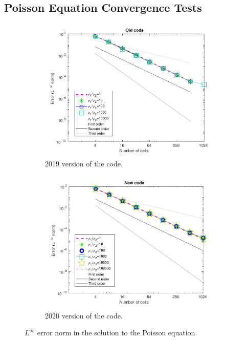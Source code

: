 \documentclass[11pt, a4paper, oneside, openany]{book}
\begin{document}
\subsection{Poisson Equation Convergence Tests}\label{Subsection_Poisson_Equation_Convergence_Tests}
\begin{figure}[!ht]
	\centering
	\begin{subfigure}{.5\textwidth}
		\includegraphics[width=1\textwidth]{PoissonConvergence2019Code.pdf}
		\caption[Poisson Convergence 2019 code]{2019 version of the code.}\label{PoissonTest2019}
	\end{subfigure}%
	\begin{subfigure}{.5\textwidth}
		\includegraphics[width=1\textwidth]{PoissonConvergence2020Code.pdf}
		\caption[Poisson Convergence 2020 code]{2020 version of the code.}\label{PoissonTest2020}
	\end{subfigure}
	\caption[Reinitialization CPU Time cost]{$L^{\infty}$ error norm in the solution to the Poisson equation.}\label{PoissonTest}
\end{figure}\noindent
\end{document}
